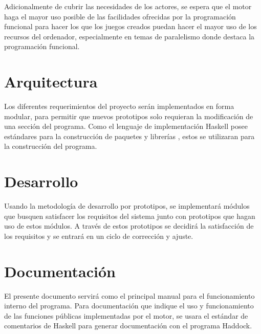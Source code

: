Adicionalmente de cubrir las necesidades de los actores, se espera que el motor haga el mayor uso posible de las facilidades ofrecidas por la programación funcional para hacer los que los juegos creados puedan hacer el mayor uso de los recursos del ordenador, especialmente en temas de paralelismo donde destaca la programación funcional.

\section{Arquitectura}

Los diferentes requerimientos del proyecto serán implementados en forma modular, para permitir que nuevos prototipos solo requieran la modificación de una sección del programa. Como el lenguaje de implementación Haskell posee estándares para la construcción de paquetes y librerías \cite{wiki:WriteAHaskellProgram}, estos se utilizaran para la construcción del programa.

\section{Desarrollo}

Usando la metodología de desarrollo por prototipos, se implementará módulos que busquen satisfacer los requisitos del sistema junto con prototipos que hagan uso de estos módulos. A través de estos prototipos se decidirá la satisfacción de los requisitos y se entrará en un ciclo de corrección y ajuste.

\section{Documentación}

El presente documento servirá como el principal manual para el funcionamiento interno del programa. Para documentación que indique el uso y funcionamiento de las funciones públicas implementadas por el motor, se usara el estándar de comentarios de Haskell para generar documentación con el programa Haddock.
